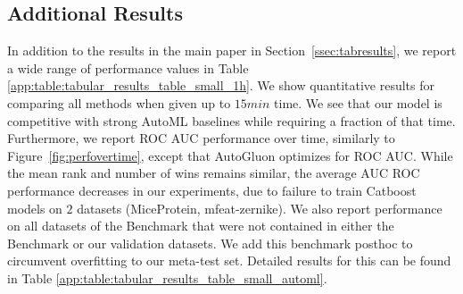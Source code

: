 \documentclass{article}
\begin{document}
\subsection{Additional Results}\label{app:ssec:addresults} %

In addition to the results in the main paper in Section~\ref{ssec:tabresults}, we report a wide range of performance values in Table \ref{app:table:tabular_results_table_small_1h}. We show quantitative results for comparing all methods when given up to $15min$ time. We see that our model is competitive with strong AutoML baselines while requiring a fraction of that time. Furthermore, we report ROC AUC performance over time, similarly to Figure~\ref{fig:perfovertime}, except that AutoGluon optimizes for ROC AUC. While the mean rank and number of wins remains similar, the average AUC ROC performance decreases in our experiments, due to failure to train Catboost models on $2$ datasets (MiceProtein, mfeat-zernike).
We also report performance on all datasets of the \openmlautoml{} Benchmark that were not contained in either the \openmlcc{} Benchmark or our validation datasets. We add this benchmark posthoc to circumvent overfitting to our meta-test set. Detailed results for this can be found in Table \ref{app:table:tabular_results_table_small_automl}.

%     

\begin{table}[h]
    \caption{ROC AUC OVO results on the small \openmlcc{} for 15 minutes requested time per dataset and per split. If available, all baselines are given ROC AUC optimization as an objective, others optimize CE. Overall each method got a time budget of 37.5 hours, but not all methods used the full budget.}
    \label{app:table:tabular_results_table_small_1h}
    \centering
    \tiny
    
\end{table}
\end{document}
